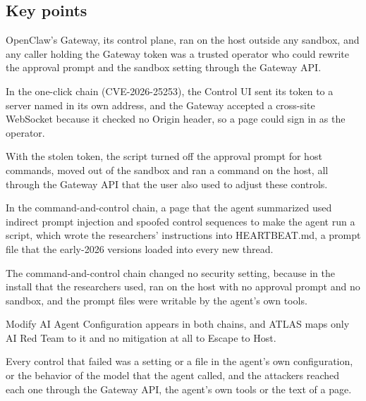 \subsection*{Key points}
\bi
\item OpenClaw's Gateway, its control plane, ran on the host outside any sandbox, and any caller
holding the Gateway token was a trusted operator who could rewrite the approval prompt and the
sandbox setting through the Gateway API.
\item In the one-click chain (CVE-2026-25253), the Control UI sent its token to a server named in its
own address, and the Gateway accepted a cross-site WebSocket because it checked no Origin header, so
a page could sign in as the operator.
\item With the stolen token, the script turned off the approval prompt for host commands, moved
 out of the sandbox and ran a command on the host, all through the Gateway API that the
user also used to adjust these controls.
\item In the command-and-control chain, a page that the agent summarized used indirect prompt
injection and spoofed control sequences to make the agent run a script, which wrote the researchers'
instructions into HEARTBEAT.md, a prompt file that the early-2026 versions loaded into every new
thread.
\item The command-and-control chain changed no security setting, because in the install that the
researchers used,  ran on the host with no approval prompt and no sandbox, and the
prompt files were writable by the agent's own tools.
\item Modify AI Agent Configuration appears in both chains, and ATLAS maps only AI Red Team to it and
no mitigation at all to Escape to Host.
\item Every control that failed was a setting or a file in the agent's own configuration, or the
behavior of the model that the agent called, and the attackers reached each one through the Gateway
API, the agent's own tools or the text of a page.
\ei
